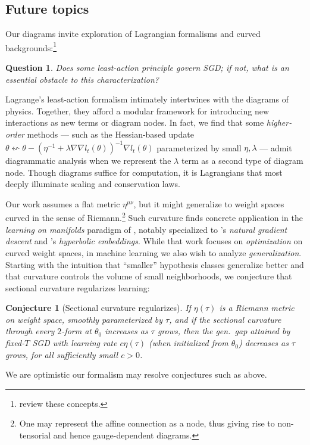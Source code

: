 \documentclass[anon,12pt]{colt2021} %
\newtheorem{conj}{Conjecture}
\newtheorem{quest}{Question}
\begin{document}
    \subsection{Future topics}                                      \label{appendix:future}

        Our diagrams invite exploration of Lagrangian formalisms and curved
        backgrounds:\footnote{
            \cite{la60, la51} review these concepts.
        }
        \begin{quest}
            Does some least-action principle govern SGD; if not, what is an
            essential obstacle to this characterization?
        \end{quest}
        Lagrange's least-action formalism intimately intertwines with the
        diagrams of physics.  Together, they afford a modular framework for
        introducing new interactions as new terms or diagram nodes.  In fact,
        we find that some \emph{higher-order} methods --- such as the
        Hessian-based update
        $
            \theta \leftsquigarrow
            \theta -
            (\eta^{-1} + \lambda \nabla \nabla l_t(\theta))^{-1}
            \nabla l_t(\theta)
        $
        parameterized by small $\eta, \lambda$ --- admit diagrammatic analysis
        when we represent the $\lambda$ term as a second type of diagram node.
        Though diagrams suffice for computation, it is Lagrangians that most
        deeply illuminate scaling and conservation laws.

        Our work assumes a flat metric $\eta^{\mu\nu}$, but it might
        generalize to weight spaces curved in the sense of Riemann.\footnote{
            One may represent the affine connection as a node, thus giving
            rise to non-tensorial and hence gauge-dependent diagrams.
        }  Such curvature finds concrete application in the \emph{learning on
        manifolds} paradigm of \cite{ab07, zh16}, notably specialized to
        \cite{am98}'s \emph{natural gradient descent} and \cite{ni17}'s
        \emph{hyperbolic embeddings}.  While that work focuses on
        \emph{optimization} on curved weight spaces, in machine learning we
        also wish to analyze \emph{generalization}.
        Starting with the intuition that ``smaller'' hypothesis classes
        generalize better and that curvature controls the volume of small
        neighborhoods, we conjecture that sectional curvature regularizes
        learning:
        \begin{conj}[Sectional curvature regularizes]
            If $\eta(\tau)$ is a Riemann metric on weight space, smoothly
            parameterized by $\tau$, and if the sectional curvature through
            every $2$-form at $\theta_0$ increases as $\tau$ grows, then
            the gen.\ gap attained by fixed-$T$ SGD with learning rate $c
            \eta(\tau)$ (when initialized from $\theta_0$) decreases as $\tau$
            grows, for all sufficiently small $c>0$.
        \end{conj}
        We are optimistic our formalism may resolve conjectures such as above.
\end{document}
